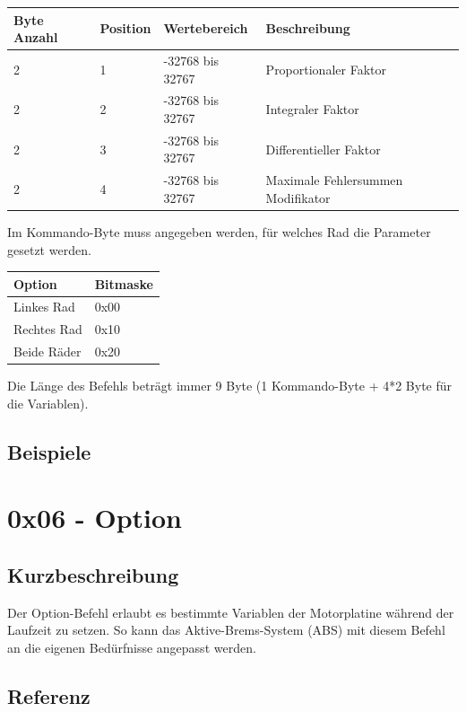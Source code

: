 \documentclass[a4paper]{article}
\begin{document}
	\begin{tabularx}{\linewidth}{|l|l|l|X|}
		\hline
		\textbf{Byte Anzahl} & \textbf{Position} & \textbf{Wertebereich} & \textbf{Beschreibung} \\
		\hline
		\hline
		2					 & 1 & -32768 bis 32767 & Proportionaler Faktor\\
		\hline
		2					 & 2 & -32768 bis 32767 & Integraler Faktor\\
		\hline
		2					 & 3 & -32768 bis 32767 & Differentieller Faktor\\
		\hline
		2					 & 4 & -32768 bis 32767 & Maximale Fehlersummen Modifikator\\
		\hline
	\end{tabularx}

	Im Kommando-Byte muss angegeben werden, für welches Rad die Parameter gesetzt werden.

	\begin{tabularx}{\linewidth}{|l|X|}
		\hline
		\textbf{Option} & \textbf{Bitmaske} \\
		\hline
		\hline
		Linkes Rad	& 0x00 \\
		\hline
		Rechtes Rad	& 0x10 \\
		\hline
		Beide Räder & 0x20 \\
		\hline
	\end{tabularx}

	Die Länge des Befehls beträgt immer 9 Byte (1 Kommando-Byte + 4*2 Byte für die Variablen).

	\subsection{Beispiele}
	\pagebreak


	\section{0x06 - Option}

	\subsection{Kurzbeschreibung}

	Der Option-Befehl erlaubt es bestimmte Variablen der Motorplatine
	während der Laufzeit zu setzen. So kann das Aktive-Brems-System (ABS)
	mit diesem Befehl an die eigenen Bedürfnisse angepasst werden.

	\subsection{Referenz}
\end{document}
